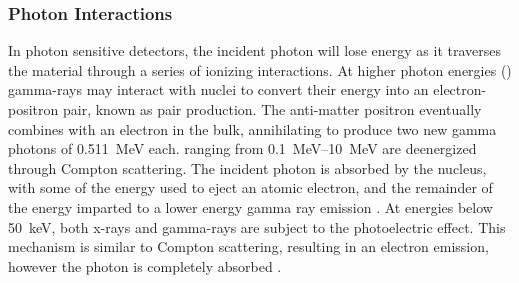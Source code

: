 \documentclass[../../../../main.tex]{subfiles}%
\begin{document}
%
    \subsubsection{Photon Interactions}%
    \label{sec:chapter-2:semiconductor-detectors:pulse-formation:photons}%
    In photon sensitive detectors, the incident photon will lose energy as it traverses the material through a series of ionizing interactions.
    At higher photon energies () \glspl{gamma-ray} may interact with nuclei to convert their energy into an electron-positron pair, known as pair production.
    The anti-matter positron eventually combines with an electron in the bulk, annihilating to produce two new gamma photons of \SI{0.511}{\mega\electronvolt} each.
     ranging from \SIrange{0.1}{10}{\mega\electronvolt} are deenergized through Compton scattering.
    The incident photon is absorbed by the nucleus, with some of the energy used to eject an atomic electron, and the remainder of the energy imparted to a lower energy gamma ray emission \cite{book:Tsoulfanidis_2010}.
    At energies below \SI{50}{\kilo\electronvolt}, both \glspl{x-ray} and \glspl{gamma-ray} are subject to the photoelectric effect.
    This mechanism is similar to Compton scattering, resulting in an electron emission, however the photon is completely absorbed \cite{book:Turner_1995}.
\end{document}
